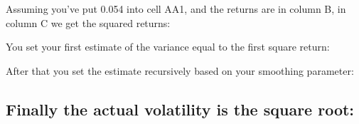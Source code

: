 Assuming you've put 0.054 into cell AA1, and the returns are in column B, in column C we get the squared returns:

\begin{quote}
\ttfamily{}
\end{quote}

You set your first estimate of the variance equal to the first square return:

\begin{quote}
\ttfamily{}
\end{quote}

After that you set the estimate recursively based on your smoothing parameter:

\begin{quote}
\ttfamily{} \ttfamily{}
\end{quote}

\subsection*{Finally the actual volatility is the square root:}

\begin{quote}
\ttfamily{}
\end{quote}
